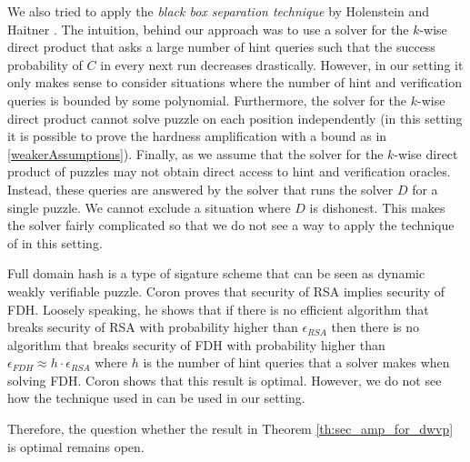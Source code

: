 We also tried to apply the \textit{black box separation technique} by Holenstein and Haitner \cite{haitner2009possibility}.
The intuition, behind our approach was to use a solver for the $k$-wise direct product that asks a large number of hint queries such that
the success probability of $C$ in every next run decreases drastically.
However, in our setting it only makes sense to consider situations where the number of hint and verification queries is bounded by some polynomial.
Furthermore, the solver for the $k$-wise direct product cannot solve puzzle on each position independently (in this setting it is possible
to prove the hardness amplification with a bound as in \ref{weakerAssumptions}).
Finally, as we assume that the solver for the $k$-wise direct product of puzzles may not obtain direct access to hint and verification oracles.
Instead, these queries are answered by the solver that runs the solver $D$ for a single puzzle. We cannot exclude a situation where $D$ is dishonest.
This makes the solver fairly complicated so that we do not see a way to apply the technique of \cite{haitner2009possibility} in this setting.

Full domain hash is a type of sigature scheme that can be seen as dynamic weakly verifiable puzzle.
Coron \cite{coron2000exact, coron2002optimal} proves that security of RSA implies security of FDH.
Loosely speaking, he shows that if there is no efficient algorithm that breaks security of RSA with probability higher
than $\epsilon_{\mathit{RSA}}$ then there is no algorithm that breaks security of FDH with probability higher than
$\epsilon_{\mathit{FDH}} \approx h \cdot \epsilon_{\mathit{RSA}}$ where $h$ is the number of hint queries that a solver makes when solving FDH.
Coron shows that this result is optimal. However, we do not see how the technique used in \cite{coron2002optimal} can be used in our setting.

Therefore, the question whether the result in Theorem \ref{th:sec_amp_for_dwvp} is optimal remains open.

